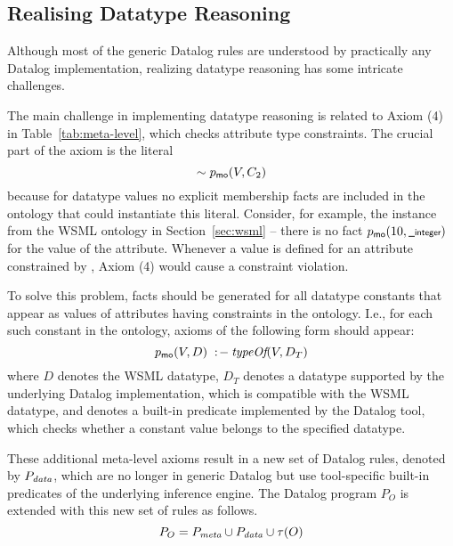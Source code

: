 \def\dataaxioms{\ensuremath{P_{\smtxtit{data}}}\xspace}
\def\transdpred{\transtxt{dpred}}

\subsection{Realising Datatype Reasoning}
\label{sec:datatype_reasoning} Although most of the generic
Datalog rules are understood by practically any Datalog
implementation, realizing datatype reasoning has some intricate
challenges.

The main challenge in implementing datatype reasoning is related
to Axiom (4) in Table~\ref{tab:meta-level}, which checks attribute
type constraints. The crucial part of the axiom is the literal
\[\sim p_{\mathrm{\sf mo}}(V,C_2)\] because for datatype values no explicit
membership facts are included in the ontology that could
instantiate this literal. Consider, for example, the instance
 from the WSML ontology in Section~\ref{sec:wsml}
-- there is no fact $p_{\mathrm{\sf mo}}(10,\textsf{\scriptsize \_integer})$ for the value of
the  attribute. Whenever a value is defined
for an attribute constrained by , Axiom (4) would
cause a constraint violation.

To solve this problem, \pmo facts should be generated for all
datatype constants that appear as values of attributes having  constraints in the ontology.
I.e., for each such constant in the ontology,
axioms of the following form should appear:
\begin{displaymath}
    p_{\mathrm{\sf mo}}(V,D) \;:\!-\: \textit{typeOf}(V, D_T)
\end{displaymath}
where $D$ denotes the WSML datatype, $D_T$ denotes a datatype
supported by the underlying Datalog implementation, which is
compatible with the WSML datatype, and \typeof denotes a built-in
predicate implemented by the Datalog tool, which checks whether a
constant value belongs to the specified datatype.

These additional meta-level axioms result in a new set of Datalog
rules, denoted by \dataaxioms, which are no longer in generic
Datalog but use tool-specific built-in predicates of the
underlying inference engine. The Datalog program $P_O$ is extended
with this new set of rules as follows.
\begin{displaymath}
    P_O = \mlaxioms \cup \dataaxioms \cup \tau(O)
\end{displaymath}

